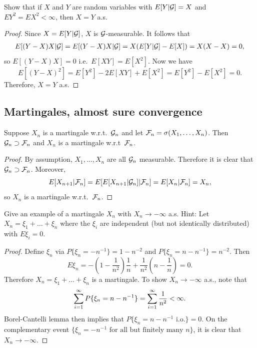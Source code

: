 \documentclass[a4paper]{article}
\begin{document}
\begin{ex}[Durrett 4.1.9]
  Show that if $X$ and $Y$ are random variables with $E[Y | \mathcal{G}] = X$
  and $E Y^2 = E X^2 < \infty$, then $X = Y$ a.s.
\end{ex}

\begin{proof}
  Since $X = E[Y | \mathcal{G}]$, $X$ is $\mathcal{G}$-measurable. It follows that
  \begin{align*}
    E[(Y - X) X | \mathcal{G}]
    = E[(Y - X) X | \mathcal{G}]
    = X (E[Y | \mathcal{G}] - E[X])
    = X (X - X) = 0,
  \end{align*}
  so $E[(Y - X) X] = 0$ i.e.\ $E[XY] = E[X^2]$. Now we have
  \[
    E[(Y - X)^2] = E[Y^2] - 2 E[XY] + E[X^2]
    = E[Y^2] - E[X^2] = 0.
  \]
  Therefore, $X = Y$ a.s.
\end{proof}

\subsection{Martingales, almost sure convergence}

\begin{ex}[Durret 4.2.1]
  Suppose $X_n$ is a martingale w.r.t.\ $\mathcal{G}_n$ and let
  $\mathcal{F}_n = \sigma (X_1, \dots, X_n)$. Then $\mathcal{G}_n \supset
    \mathcal{F}_n$ and $X_n$ is a martingale w.r.t\ $\mathcal{F}_n$.
\end{ex}

\begin{proof}
  By assumption, $X_1, \dots, X_n$ are all $\mathcal{G}_n$ measurable.
  Therefore it is clear that $\mathcal{G}_n \supset \mathcal{F}_n$.
  Moreover,
  \[
    E[X_{n + 1} | \mathcal{F}_n] = E[E[X_{n+1} | \mathcal{G}_n] | \mathcal{F}_n]
    = E[X_n | \mathcal{F}_n] = X_n,
  \]
  so $X_n$ is a martingale w.r.t.\ $\mathcal{F}_n$.

\end{proof}

\begin{ex}[Durret 4.2.5]
  Give an example of a martingale $X_n$ with $X_n \to - \infty$ a.s.
  Hint: Let $X_n = \xi_1 + \dots + \xi_n$ where the $\xi_i$ are
  independent (but not identically distributed) with $E \xi_i = 0$.
\end{ex}

\begin{proof}
  Define $\xi_n$ via $P \{\xi_n = - n^{-1}\} = 1 - n^{-2}$
  and $P\{\xi_n = n - n^{-1}\} = n^{-2}$. Then
  \[
    E \xi_n = - \left( 1 - \frac{1}{n^2} \right) \frac{1}{n}
    + \frac{1}{n^2} \left( n - \frac{1}{n} \right) = 0.
  \]
  Therefore $X_n = \xi_1 + \dots + \xi_n$ is a martingale. To show
  $X_n \to -\infty$ a.s., note that
  \[
    \sum_{i=1}^\infty P\{\xi_n = n - n^{-1}\} = \sum_{i=1}^\infty \frac{1}{n^2} < \infty.
  \]
  Borel-Cantelli lemma then implies that $P \{\xi_n = n - n^{-1}
    \text{ i.o.}\} = 0$. On the complementary event $\{\xi_n = -n^{-1}
    \text{ for all but finitely many $n$}\}$, it is clear that
  $X_n \to -\infty$.

\end{proof}
\end{document}

